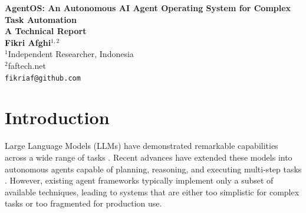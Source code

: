 \documentclass[12pt,a4paper]{article}
\begin{document}
\begin{center}
\Large\textbf{AgentOS: An Autonomous AI Agent Operating System for Complex Task Automation}
\\[0.5em]
\large\textbf{A Technical Report}
\\[1em]
\normalsize\textbf{Fikri Afghi}$^{1,2}$
\\[0.3em]
\small
$^1$Independent Researcher, Indonesia \\
$^2$faftech.net \\
\texttt{fikriaf@github.com}
\end{center}

\vspace{1em}

\begin{abstract}
We present AgentOS, an autonomous AI agent operating system that integrates nine state-of-the-art AI agent research papers into a cohesive, production-ready CLI framework. AgentOS combines recursive task decomposition (ROMA), hierarchical tool allocation (HTAA), safety-first execution (MOSAIC), budget-aware planning (INTENT), and reflective learning (REDEREF) into a unified system. The framework provides a command-line interface for developers and non-technical users alike, supporting multi-step task automation, persistent memory, semantic search, and extensible tool integration via the Model Context Protocol (MCP). AgentOS is available as open-source software at \url{https://github.com/fikriaf/agentos}.

\bigskip
\noindent\textbf{Keywords:} autonomous agents, large language models, task planning, tool use, AI safety, CLI framework
\end{abstract}

\section{Introduction}

Large Language Models (LLMs) have demonstrated remarkable capabilities across a wide range of tasks \citep{openai2023gpt4, anthropic2023claude}. Recent advances have extended these models into autonomous agents capable of planning, reasoning, and executing multi-step tasks \citep{yao2022react, shinn2023reflexion, wei2022chainofthought}. However, existing agent frameworks typically implement only a subset of available techniques, leading to systems that are either too simplistic for complex tasks or too fragmented for production use.
\end{document}
